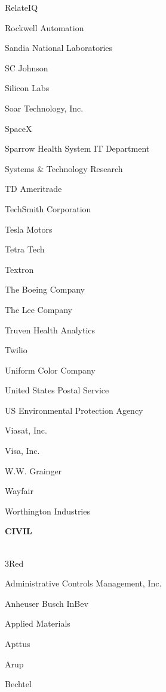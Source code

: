 \documentclass[twoside]{article}
\begin{document}
\begin{center}
\begin{multicols}{5}
\begin{FlushLeft}
\begin{compactitem}
\item RelateIQ
\item Rockwell Automation
\item Sandia National Laboratories
\item SC Johnson
\item Silicon Labs
\item Soar Technology, Inc.
\item SpaceX
\item Sparrow Health System IT Department
\item Systems \& Technology Research
\item TD Ameritrade
\item TechSmith Corporation
\item Tesla Motors
\item Tetra Tech
\item Textron
\item The Boeing Company
\item The Lee Company
\item Truven Health Analytics
\item Twilio
\item Uniform Color Company
\item United States Postal Service
\item US Environmental Protection Agency
\item Viasat, Inc.
\item Visa, Inc.
\item W.W. Grainger
\item Wayfair
\item Worthington Industries
\end{compactitem}
        \end{FlushLeft}
        \vspace{1em}
        {\fontsize{14}{16}\selectfont \bf CIVIL}\\
        \vspace{-1em}
        ~\hrulefill~
        \vspace{-.9em}
        \begin{FlushLeft}
        \begin{compactitem}
        \item 3Red
\item Administrative Controls Management, Inc.
\item Anheuser Busch InBev
\item Applied Materials
\item Apttus
\item Arup
\item Bechtel

\end{compactitem}
\end{FlushLeft}
\end{multicols}
\end{center}
\end{document}
